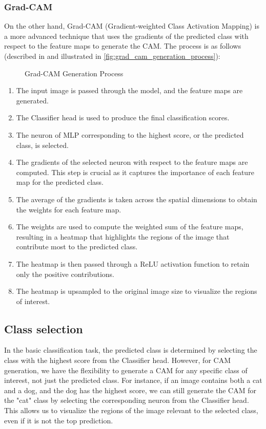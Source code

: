 \subsubsection{Grad-CAM}
\label{subsec:grad_cam_generation_process}
On the other hand, Grad-CAM (Gradient-weighted Class Activation Mapping) is a more advanced technique that uses the gradients of the predicted class with respect to the feature maps to generate the CAM. The process is as follows (described in \cite{cam_grad} and illustrated in \autoref{fig:grad_cam_generation_process}):

\begin{figure}[htbp]
    \centering
    \caption{Grad-CAM Generation Process}
    \label{fig:grad_cam_generation_process}
\end{figure}

\begin{enumerate}
    \item The input image is passed through the model, and the feature maps are generated.
    \item The Classifier head is used to produce the final classification scores.
    \item The neuron of MLP corresponding to the highest score, or the predicted class, is selected.
    \item The gradients of the selected neuron with respect to the feature maps are computed. This step is crucial as it captures the importance of each feature map for the predicted class.
    \item The average of the gradients is taken across the spatial dimensions to obtain the weights for each feature map.
    \item The weights are used to compute the weighted sum of the feature maps, resulting in a heatmap that highlights the regions of the image that contribute most to the predicted class.
    \item The heatmap is then passed through a ReLU activation function to retain only the positive contributions.
    \item The heatmap is upsampled to the original image size to visualize the regions of interest.
\end{enumerate}

\subsection{Class selection}
\label{subsec:class_selection}
In the basic classification task, the predicted class is determined by selecting the class with the highest score from the Classifier head. However, for CAM generation, we have the flexibility to generate a CAM for any specific class of interest, not just the predicted class. For instance, if an image contains both a cat and a dog, and the dog has the highest score, we can still generate the CAM for the "cat" class by selecting the corresponding neuron from the Classifier head. This allows us to visualize the regions of the image relevant to the selected class, even if it is not the top prediction.


